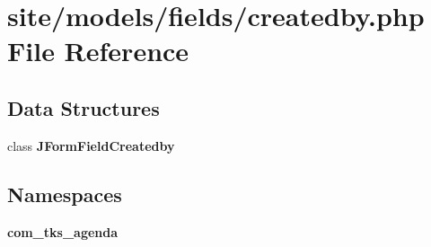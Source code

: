 \section{site/models/fields/createdby.php File Reference}
\label{site_2models_2fields_2createdby_8php}
\subsection*{Data Structures}
\begin{DoxyCompactItemize}
\item 
class \textbf{ J\+Form\+Field\+Createdby}
\end{DoxyCompactItemize}
\subsection*{Namespaces}
\begin{DoxyCompactItemize}
\item 
 \textbf{ com\+\_\+tks\+\_\+agenda}
\end{DoxyCompactItemize}
